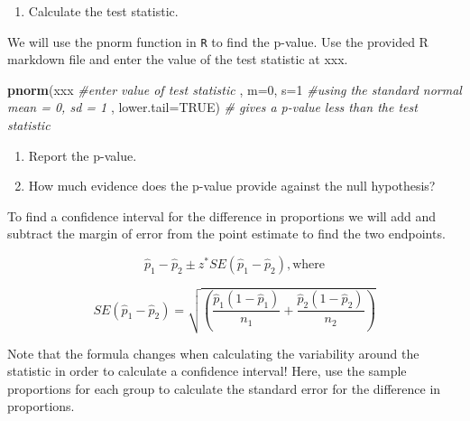 \documentclass[
]{report}
\newenvironment{Shaded}{\begin{snugshade}}{\end{snugshade}}
\newcommand{\CommentTok}[1]{\textcolor[rgb]{0.56,0.35,0.01}{\textit{#1}}}
\newcommand{\DataTypeTok}[1]{\textcolor[rgb]{0.13,0.29,0.53}{#1}}
\newcommand{\DecValTok}[1]{\textcolor[rgb]{0.00,0.00,0.81}{#1}}
\newcommand{\KeywordTok}[1]{\textcolor[rgb]{0.13,0.29,0.53}{\textbf{#1}}}
\newcommand{\NormalTok}[1]{#1}
\newcommand{\OtherTok}[1]{\textcolor[rgb]{0.56,0.35,0.01}{#1}}
\providecommand{\tightlist}{%
  \setlength{\itemsep}{0pt}\setlength{\parskip}{0pt}}
\begin{document}
\vspace{1in}

\begin{enumerate}
\def\labelenumi{\arabic{enumi}.}
\setcounter{enumi}{18}
\tightlist
\item
  Calculate the test statistic.
\end{enumerate}

\vspace{1in}

We will use the pnorm function in \texttt{R} to find the p-value. Use the provided R markdown file and enter the value of the test statistic at xxx.

\begin{Shaded}
\begin{Highlighting}[]
    \KeywordTok{pnorm}\NormalTok{(xxx }\CommentTok{#enter value of test statistic}
\NormalTok{      , }\DataTypeTok{m=}\DecValTok{0}\NormalTok{, }\DataTypeTok{s=}\DecValTok{1} \CommentTok{#using the standard normal mean = 0, sd = 1}
\NormalTok{      , }\DataTypeTok{lower.tail=}\OtherTok{TRUE}\NormalTok{) }\CommentTok{# gives a p-value less than the test statistic}
\end{Highlighting}
\end{Shaded}

\begin{enumerate}
\def\labelenumi{\arabic{enumi}.}
\setcounter{enumi}{19}
\item
  Report the p-value.
  \vspace{0.2in}
\item
  How much evidence does the p-value provide against the null hypothesis?
\end{enumerate}

\vspace{0.4in}

To find a confidence interval for the difference in proportions we will add and subtract the margin of error from the point estimate to find the two endpoints.

\[\hat{p}_1-\hat{p}_2\pm z^*SE(\hat{p}_1-\hat{p}_2), \text{where}\]

\[SE(\hat{p}_1-\hat{p}_2) = \sqrt{\left(\frac{\hat{p}_1 (1-\hat{p}_1)}{n_1}+\frac{\hat{p}_2 (1-\hat{p}_2)}{n_2}\right)}\]

Note that the formula changes when calculating the variability around the statistic in order to calculate a confidence interval! Here, use the sample proportions for each group to calculate the standard error for the difference in proportions.
\end{document}
